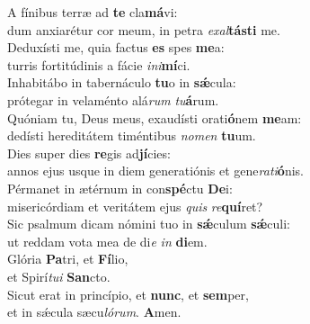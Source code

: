 \evenverse A fínibus terræ ad \textbf{te} cla\textbf{má}vi:~\*\\
\evenverse dum anxiarétur cor meum, in petra \textit{e}\textit{xal}\textbf{tá}\textbf{sti} me.\\
\oddverse Deduxísti me, quia factus \textbf{es} spes \textbf{me}a:~\*\\
\oddverse turris fortitúdinis a fácie \textit{i}\textit{ni}\textbf{mí}ci.\\
\evenverse Inhabitábo in tabernáculo \textbf{tu}o in \textbf{sǽ}cula:~\*\\
\evenverse prótegar in velaménto alá\textit{rum} \textit{tu}\textbf{á}rum.\\
\oddverse Quóniam tu, Deus meus, exaudísti orati\textbf{ó}nem \textbf{me}am:~\*\\
\oddverse dedísti hereditátem timéntibus \textit{no}\textit{men} \textbf{tu}um.\\
\evenverse Dies super dies \textbf{re}gis ad\textbf{jí}cies:~\*\\
\evenverse annos ejus usque in diem generatiónis et gene\textit{ra}\textit{ti}\textbf{ó}nis.\\
\oddverse Pérmanet in ætérnum in con\textbf{spé}ctu \textbf{De}i:~\*\\
\oddverse misericórdiam et veritátem ejus \textit{quis} \textit{re}\textbf{quí}ret?\\
\evenverse Sic psalmum dicam nómini tuo in \textbf{sǽ}culum \textbf{sǽ}culi:~\*\\
\evenverse ut reddam vota mea de di\textit{e} \textit{in} \textbf{di}em.\\
\oddverse Glória \textbf{Pa}tri, et \textbf{Fí}lio,~\*\\
\oddverse et Spirí\textit{tu}\textit{i} \textbf{San}cto.\\
\evenverse Sicut erat in princípio, et \textbf{nunc}, et \textbf{sem}per,~\*\\
\evenverse et in sǽcula sæcu\textit{ló}\textit{rum}. \textbf{A}men.\\
